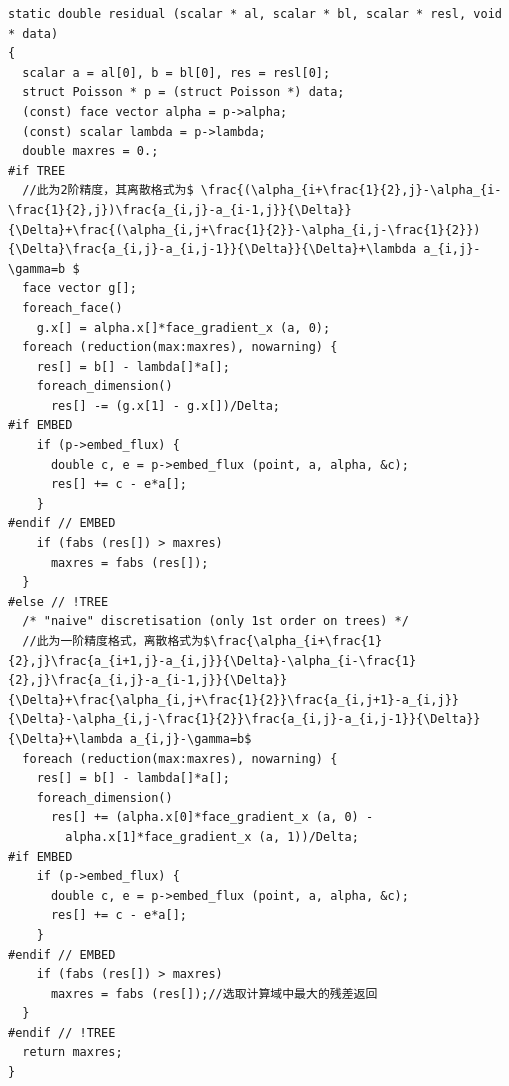 \documentclass[lang=cn,11pt,a4paper]{elegantpaper}
\begin{document}
\begin{verbatim}
static double residual (scalar * al, scalar * bl, scalar * resl, void * data)
{
  scalar a = al[0], b = bl[0], res = resl[0];
  struct Poisson * p = (struct Poisson *) data;
  (const) face vector alpha = p->alpha;
  (const) scalar lambda = p->lambda;
  double maxres = 0.;
#if TREE
  //此为2阶精度，其离散格式为$ \frac{(\alpha_{i+\frac{1}{2},j}-\alpha_{i-\frac{1}{2},j})\frac{a_{i,j}-a_{i-1,j}}{\Delta}}{\Delta}+\frac{(\alpha_{i,j+\frac{1}{2}}-\alpha_{i,j-\frac{1}{2}}){\Delta}\frac{a_{i,j}-a_{i,j-1}}{\Delta}}{\Delta}+\lambda a_{i,j}-\gamma=b $
  face vector g[];
  foreach_face()
    g.x[] = alpha.x[]*face_gradient_x (a, 0);
  foreach (reduction(max:maxres), nowarning) {
    res[] = b[] - lambda[]*a[];
    foreach_dimension()
      res[] -= (g.x[1] - g.x[])/Delta;
#if EMBED
    if (p->embed_flux) {
      double c, e = p->embed_flux (point, a, alpha, &c);
      res[] += c - e*a[];
    }
#endif // EMBED    
    if (fabs (res[]) > maxres)
      maxres = fabs (res[]);
  }
#else // !TREE
  /* "naive" discretisation (only 1st order on trees) */
  //此为一阶精度格式，离散格式为$\frac{\alpha_{i+\frac{1}{2},j}\frac{a_{i+1,j}-a_{i,j}}{\Delta}-\alpha_{i-\frac{1}{2},j}\frac{a_{i,j}-a_{i-1,j}}{\Delta}}{\Delta}+\frac{\alpha_{i,j+\frac{1}{2}}\frac{a_{i,j+1}-a_{i,j}}{\Delta}-\alpha_{i,j-\frac{1}{2}}\frac{a_{i,j}-a_{i,j-1}}{\Delta}}{\Delta}+\lambda a_{i,j}-\gamma=b$
  foreach (reduction(max:maxres), nowarning) {
    res[] = b[] - lambda[]*a[];
    foreach_dimension()
      res[] += (alpha.x[0]*face_gradient_x (a, 0) -
        alpha.x[1]*face_gradient_x (a, 1))/Delta;  
#if EMBED
    if (p->embed_flux) {
      double c, e = p->embed_flux (point, a, alpha, &c);
      res[] += c - e*a[];
    }
#endif // EMBED
    if (fabs (res[]) > maxres)
      maxres = fabs (res[]);//选取计算域中最大的残差返回
  }
#endif // !TREE
  return maxres;
}
\end{verbatim}
\end{document}
